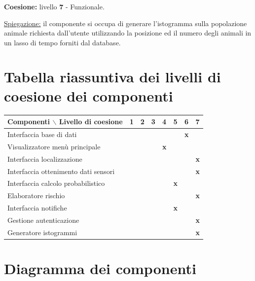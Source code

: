 \vspace{5mm}
\noindent
\textbf{Coesione:} livello \textbf{7} - Funzionale.

\noindent
\underline{Spiegazione:} il componente si occupa di generare l'istogramma sulla popolazione animale richiesta dall'utente utilizzando la posizione ed il numero degli animali in un lasso di tempo forniti dal database.

\section{Tabella riassuntiva dei livelli di coesione dei componenti}
\begin{table}[ht]
    \centering
    \begin{tabular}{|l|c|c|c|c|c|c|c|}
        \hline
        \textbf{Componenti $\backslash$  Livello di coesione} & 1 & 2 & 3 & 4 & 5 & 6 & 7 \\
        \hline
        \rowcolor{Gray}
        Interfaccia base di dati & & & & & & \textbf{x} & \\
        \hline
        Visualizzatore menù principale & & & & \textbf{x} & & & \\
        \hline
        \rowcolor{Gray}
        Interfaccia localizzazione & & & & & & & \textbf{x}\\
        \hline
        Interfaccia ottenimento dati sensori & & & & & & & \textbf{x} \\
        \hline
        \rowcolor{Gray}
        Interfaccia calcolo probabilistico & & & & & \textbf{x} & & \\
        \hline
        Elaboratore rischio & & & & & & & \textbf{x} \\
        \hline
        \rowcolor{Gray}
        Interfaccia notifiche & & & & & \textbf{x} & & \\
        \hline
        Gestione autenticazione& & & & & & & \textbf{x} \\
        \hline
        \rowcolor{Gray}
        Generatore istogrammi & & & & & & & \textbf{x}\\
        \hline
    \end{tabular}
\end{table}


\section{Diagramma dei componenti}

